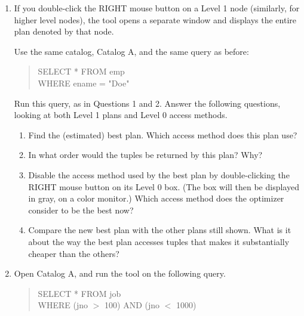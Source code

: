 \begin{enumerate}
\item
If you double-click the RIGHT mouse button on a Level 1 node 
(similarly, for higher
level nodes), the tool opens a separate window and displays the entire plan 
denoted by that node.


Use the same catalog, Catalog A, and the same query as before:
\begin{quote}
        SELECT * FROM emp\\
        WHERE ename = "Doe"
\end{quote}

Run this query, as in Questions 1 and 2.
Answer the following questions, looking at both Level 1 plans and 
Level 0 access methods.
\begin{enumerate}
\item
Find the (estimated) best plan.  Which access method does this plan use?
\item
In what order would the tuples be returned by this plan?  Why?
\item
Disable the access method used by the best plan by double-clicking the
RIGHT mouse button on its Level 0 box.  (The box will then be displayed
in gray, on a color monitor.)  Which access method does the optimizer
consider to be the best now?
\item
Compare the new best plan with the other plans still shown.  What is it
about the way the best plan accesses tuples that makes it substantially
cheaper than the others?
\end{enumerate}


\item

Open Catalog A, and run the tool on the following query.
\begin{quote}
        SELECT * FROM job\\
        WHERE (jno $>$ 100) AND (jno $<$ 1000)
\end{quote}


\end{enumerate}
